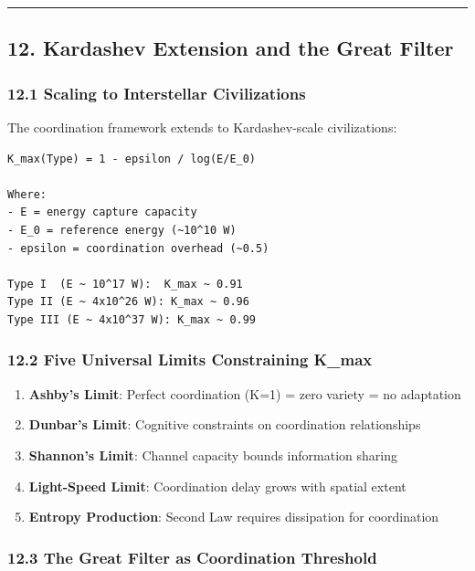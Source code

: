 \documentclass[11pt,letterpaper]{article}
\providecommand{\tightlist}{%
  \setlength{\itemsep}{0pt}\setlength{\parskip}{0pt}}
\begin{document}
\begin{center}\rule{0.5\linewidth}{0.5pt}\end{center}

\subsection{12. Kardashev Extension and the Great
Filter}\label{kardashev-extension-and-the-great-filter}

\subsubsection{12.1 Scaling to Interstellar
Civilizations}\label{scaling-to-interstellar-civilizations}

The coordination framework extends to Kardashev-scale civilizations:

\begin{verbatim}
K_max(Type) = 1 - epsilon / log(E/E_0)

Where:
- E = energy capture capacity
- E_0 = reference energy (~10^10 W)
- epsilon = coordination overhead (~0.5)

Type I  (E ~ 10^17 W):  K_max ~ 0.91
Type II (E ~ 4x10^26 W): K_max ~ 0.96
Type III (E ~ 4x10^37 W): K_max ~ 0.99
\end{verbatim}

\subsubsection{12.2 Five Universal Limits Constraining
K\_max}\label{five-universal-limits-constraining-k_max}

\begin{enumerate}
\def\labelenumi{\arabic{enumi}.}
\tightlist
\item
  \textbf{Ashby's Limit}: Perfect coordination (K=1) = zero variety = no
  adaptation
\item
  \textbf{Dunbar's Limit}: Cognitive constraints on coordination
  relationships
\item
  \textbf{Shannon's Limit}: Channel capacity bounds information sharing
\item
  \textbf{Light-Speed Limit}: Coordination delay grows with spatial
  extent
\item
  \textbf{Entropy Production}: Second Law requires dissipation for
  coordination
\end{enumerate}

\subsubsection{12.3 The Great Filter as Coordination
Threshold}\label{the-great-filter-as-coordination-threshold}
\end{document}
